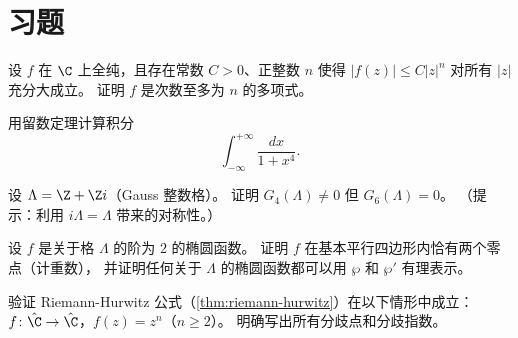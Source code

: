 \section{习题}
\label{sec:ch1-exercises}

\begin{exercise}
\label{ex:ch1-1}
设 $f$ 在 $\C$ 上全纯，且存在常数 $C > 0$、正整数 $n$ 使得
$|f(z)| \leq C|z|^n$ 对所有 $|z|$ 充分大成立。
证明 $f$ 是次数至多为 $n$ 的多项式。
\end{exercise}

\begin{exercise}
\label{ex:ch1-2}
用留数定理计算积分
\[
  \int_{-\infty}^{+\infty} \frac{dx}{1 + x^4}.
\]
\end{exercise}

\begin{exercise}
\label{ex:ch1-3}
设 $\Lambda = \Z + \Z i$（Gauss 整数格）。
证明 $G_4(\Lambda) \neq 0$ 但 $G_6(\Lambda) = 0$。
（提示：利用 $i\Lambda = \Lambda$ 带来的对称性。）
\end{exercise}

\begin{exercise}
\label{ex:ch1-4}
设 $f$ 是关于格 $\Lambda$ 的阶为 $2$ 的椭圆函数。
证明 $f$ 在基本平行四边形内恰有两个零点（计重数），
并证明任何关于 $\Lambda$ 的椭圆函数都可以用 $\wp$ 和 $\wp'$ 有理表示。
\end{exercise}

\begin{exercise}
\label{ex:ch1-5}
验证 Riemann-Hurwitz 公式（\cref{thm:riemann-hurwitz}）在以下情形中成立：
$f\colon \hat\C \to \hat\C$，$f(z) = z^n$（$n \geq 2$）。
明确写出所有分歧点和分歧指数。
\end{exercise}
